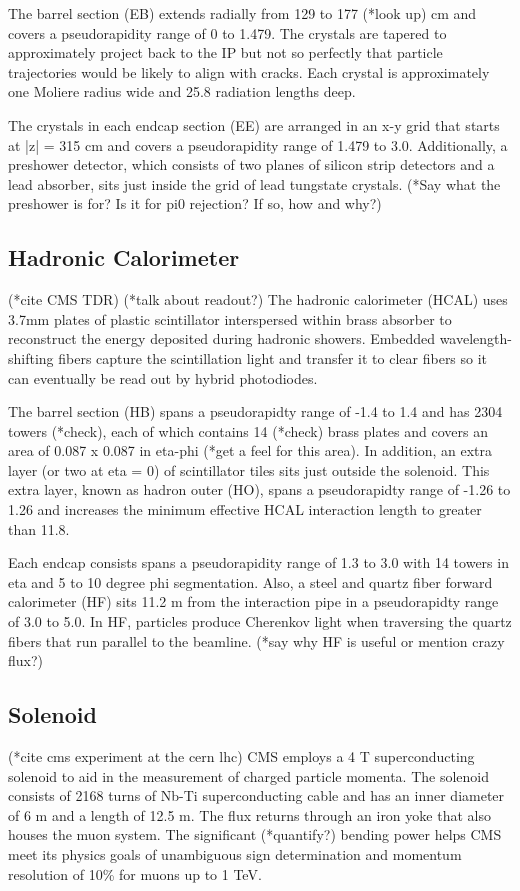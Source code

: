 \documentclass[12pt]{article}
\begin{document}
        The barrel section (EB) extends radially from 129 to 177 (*look up) cm and covers a pseudorapidity range of 0 to 1.479. The crystals are tapered to approximately project back to the IP but not so perfectly that particle trajectories would be likely to align with cracks. Each crystal is approximately one Moliere radius wide and 25.8 radiation lengths deep.

        The crystals in each endcap section (EE) are arranged in an x-y grid that starts at |z| = 315 cm and covers a pseudorapidity range of 1.479 to 3.0. Additionally, a preshower detector, which consists of two planes of silicon strip detectors and a lead absorber, sits just inside the grid of lead tungstate crystals. (*Say what the preshower is for? Is it for pi0 rejection? If so, how and why?)

\subsection{Hadronic Calorimeter}
        (*cite CMS TDR)
        (*talk about readout?)
        The hadronic calorimeter (HCAL) uses 3.7mm plates of plastic scintillator interspersed within brass absorber to reconstruct the energy deposited during hadronic showers. Embedded wavelength-shifting fibers capture the scintillation light and transfer it to clear fibers so it can eventually be read out by hybrid photodiodes.

        The barrel section (HB) spans a pseudorapidty range of -1.4 to 1.4 and has 2304 towers (*check), each of which contains 14 (*check) brass plates and covers an area of 0.087 x 0.087 in eta-phi (*get a feel for this area). In addition, an extra layer (or two at eta = 0) of scintillator tiles sits just outside the solenoid. This extra layer, known as hadron outer (HO), spans a pseudorapidty range of -1.26 to 1.26 and increases the minimum effective HCAL interaction length to greater than 11.8.

        Each endcap consists spans a pseudorapidity range of 1.3 to 3.0 with 14 towers in eta and 5 to 10 degree phi segmentation. Also, a steel and quartz fiber forward calorimeter (HF) sits 11.2 m from the interaction pipe in a pseudorapidty range of 3.0 to 5.0. In HF, particles produce Cherenkov light when traversing the quartz fibers that run parallel to the beamline. (*say why HF is useful or mention crazy flux?)

\subsection{Solenoid}
        (*cite cms experiment at the cern lhc)
        CMS employs a 4 T superconducting solenoid to aid in the measurement of charged particle momenta. The solenoid consists of 2168 turns of Nb-Ti superconducting cable and has an inner diameter of 6 m and a length of 12.5 m. The flux returns through an iron yoke that also houses the muon system. The significant (*quantify?) bending power helps CMS meet its physics goals of unambiguous sign determination and momentum resolution of 10\% for muons up to 1 TeV.
\end{document}
